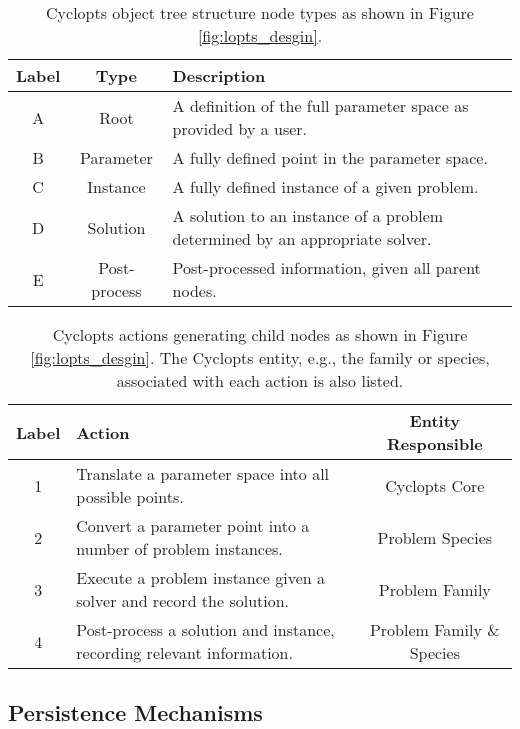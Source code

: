 \begin{table}[h!]
\centering
\caption{Cyclopts object tree structure node types as shown in Figure \ref{fig:lopts_desgin}.}
\label{tbl:lopts_nodes}
\begin{tabularx}{\columnwidth-10pt}{|c|c|X|} %
\hline
Label    & Type & Description
\\ \hline
A & Root & A definition of the full parameter space as provided by a user.
\\ \hline
B & Parameter & A fully defined point in the parameter space.
\\ \hline
C & Instance & A fully defined instance of a given problem.
\\ \hline
D & Solution & A solution to an instance of a problem determined by an appropriate solver.
\\ \hline
E & Post-process & Post-processed information, given all parent nodes.
\\ \hline
\end{tabularx}
\end{table}

\begin{table}[h!]
\centering
\caption{Cyclopts actions generating child nodes as shown in Figure
  \ref{fig:lopts_desgin}. The Cyclopts entity, e.g., the family or species,
  associated with each action is also listed.}
\label{tbl:lopts_actions}
\begin{tabularx}{\columnwidth-10pt}{|c|X|c|} %
\hline
Label & Action & Entity Responsible
\\ \hline
1 & Translate a parameter space into all possible points. & Cyclopts Core
\\ \hline
2 & Convert a parameter point into a number of problem instances. & Problem Species
\\ \hline
3 & Execute a problem instance given a solver and record the solution. & Problem Family
\\ \hline
4 & Post-process a solution and instance, recording relevant information. & Problem Family \& Species
\\ \hline
\end{tabularx}
\end{table}

\subsection{Persistence Mechanisms}\label{method:tools:hdf5}

